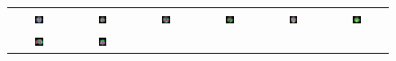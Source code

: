 \documentclass[runningheads, a4paper]{llncs}
\begin{document}
\begin{figure}[!t]
 \begin{center}
 \begin{tabular}{cccccc}
      \includegraphics[width=0.15\textwidth]{figures/wholebrain/sub1/axial0028} &
      \includegraphics[width=0.15\textwidth]{figures/wholebrain/sub1/axial0034} &
      \vspace{0.5pt}
      \includegraphics[width=0.15\textwidth]{figures/wholebrain/sub2/axial0028} &
      \includegraphics[width=0.15\textwidth]{figures/wholebrain/sub2/axial0034} &
      \vspace{0.5pt}
      \includegraphics[width=0.15\textwidth]{figures/wholebrain/sub5/axial0028} &
      \includegraphics[width=0.15\textwidth]{figures/wholebrain/sub5/axial0034} \\

      \includegraphics[width=0.15\textwidth]{figures/wholebrain/sub1/saggital0029} &
      \includegraphics[width=0.15\textwidth]{figures/wholebrain/sub1/coronal0029} &
      \vspace{0.5pt}


\end{tabular}
\end{center}
\end{figure}
\end{document}
